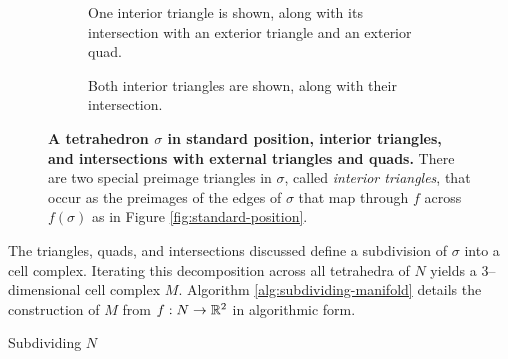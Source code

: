 \begin{figure}[h!]
	\begin{subfigure}[t]{0.45\textwidth}
		\caption{One interior triangle is shown, along with its intersection with an exterior triangle and an exterior quad.} \label{fig:standard-position-interior-exterior}
	\end{subfigure}
	\hfill
	\begin{subfigure}[t]{0.45\textwidth}
		\caption{Both interior triangles are shown, along with their intersection.} \label{fig:standard-position-interior-interior}
	\end{subfigure}
	
	\caption{
		\textbf{A tetrahedron $\sigma$ in standard position, interior triangles, and intersections with external triangles and quads.}
		There are two special preimage triangles in $\sigma$, called \emph{interior triangles}, that occur as the preimages of the edges of $\sigma$ that map through $f$ across $f(\sigma)$ as in Figure \ref{fig:standard-position}.
	}
	\label{fig:standard-position-interior}
\end{figure}

The triangles, quads, and intersections discussed define a subdivision of $\sigma$ into a cell complex.
Iterating this decomposition across all tetrahedra of $N$ yields a 3--dimensional cell complex $M$.
Algorithm \ref{alg:subdividing-manifold} details the construction of $M$ from $f:N\to\mathbb{R}^2$ in algorithmic form. 

\begin{algorithm}
	\caption{Subdividing $N$}
	\label{alg:subdividing-manifold}
\end{algorithm}


